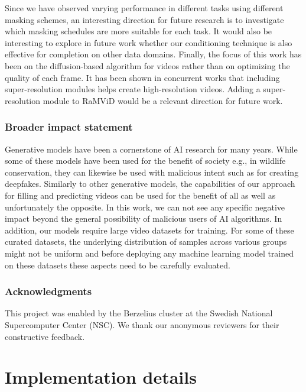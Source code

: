 \documentclass[10pt]{article} \usepackage[accepted]{tmlr}
\begin{document}
Since we have observed varying performance in different tasks using different masking schemes, an interesting direction for future research is to investigate which masking schedules are more suitable for each task.
It would also be interesting to explore in future work whether our conditioning technique is also effective for completion on other data domains. 
Finally, the focus of this work has been on the diffusion-based algorithm for videos rather than on optimizing the quality of each frame. It has been shown in concurrent works that including super-resolution modules helps create high-resolution videos. Adding a super-resolution module to RaMViD would be a relevant direction for future work.

\subsubsection*{Broader impact statement}
Generative models have been a cornerstone of AI research for many years. While some of these models have been used for the benefit of society e.g., in wildlife conservation, they can likewise be used with malicious intent such as for creating deepfakes. Similarly to other generative models, the capabilities of our approach for filling and predicting videos can be used for the benefit of all as well as unfortunately the opposite. In this work, we can not see any specific negative impact beyond the general possibility of malicious users of AI algorithms. In addition, our models require large video datasets for training. For some of these curated datasets, the underlying distribution of samples across various groups might not be uniform and before deploying any machine learning model trained on these datasets these aspects need to be carefully evaluated.  

\subsubsection*{Acknowledgments}
This project was enabled by the Berzelius cluster at the Swedish National Supercomputer Center (NSC).
We thank our anonymous reviewers for their constructive feedback.





\clearpage

\appendix
\section{Implementation details}
\label{sec:implementation details}
\end{document}
